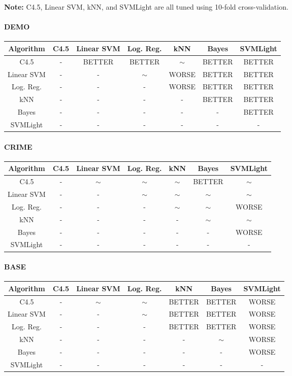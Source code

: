 \documentclass[11pt,letter]{article}
\begin{document}
\textbf{Note:} C4.5, Linear SVM, kNN, and SVMLight are all tuned using 10-fold cross-validation.

\paragraph{DEMO} \quad

\begin{tabular}{|c|c|c|c|c|c|c|}
\hline
Algorithm & C4.5  & Linear SVM & Log. Reg.  & kNN  & Bayes & SVMLight \\
\hline
C4.5 	& -		& BETTER	& BETTER	& $\sim$	& BETTER	& BETTER	\\
Linear SVM		& -		& -			& $\sim$	& WORSE		& BETTER	& BETTER	\\
Log. Reg. 	& -		& -			& -			& WORSE		& BETTER	& BETTER	\\
kNN 		& -		& -			& -			& -			& BETTER	& BETTER	\\
Bayes			& -		& -			& -			& -			& -			& BETTER	\\
SVMLight & - & - & - & - & - & - \\
\hline
\end{tabular}

\paragraph{CRIME} \quad

\begin{tabular}{|c|c|c|c|c|c|c|}
\hline
Algorithm & C4.5  & Linear SVM & Log. Reg. & kNN  & Bayes & SVMLight \\
\hline
C4.5 	& -		& $\sim$	& $\sim$	& $\sim$	& BETTER	& $\sim$	\\
Linear SVM		& -		& -			& $\sim$	& $\sim$	& $\sim$	& $\sim$	\\
Log. Reg. 	& -		& -			& -			& $\sim$	& $\sim$	& WORSE 	\\
kNN 		& -		& -			& -			& -			& $\sim$	& $\sim$	\\
Bayes			& -		& -			& -			& -			& -			& WORSE		\\
SVMLight & - & - & - & - & - & - \\
\hline
\end{tabular}

\paragraph{BASE} \quad

\begin{tabular}{|c|c|c|c|c|c|c|}
\hline
Algorithm & C4.5  & Linear SVM & Log. Reg.  & kNN  & Bayes & SVMLight \\
\hline
C4.5 	& -		& $\sim$	& $\sim$	& BETTER	& BETTER	& WORSE		\\
Linear SVM		& -		& -			& $\sim$	& BETTER	& BETTER	& WORSE		\\
Log. Reg. 	& -		& -			& -			& BETTER	& BETTER	& WORSE 	\\
kNN 		& -		& -			& -			& -			& $\sim$	& WORSE		\\
Bayes			& -		& -			& -			& -			& -			& WORSE		\\
SVMLight & - & - & - & - & - & - \\
\hline
\end{tabular}
\end{document}
